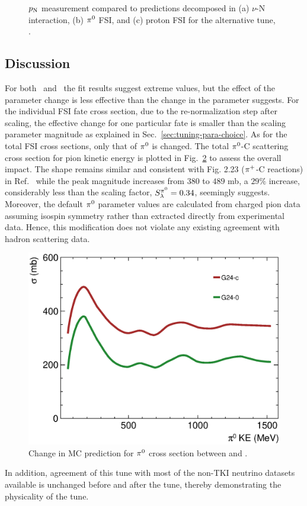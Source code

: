 \begin{figure}[!htb]
    \caption{\label{fig:minpiz-alttune} \minpiz $p_\textrm{N}$ measurement compared to \genie predictions decomposed in  (a) $\nu$-N interaction, (b) $\pi^0$ FSI, and (c) proton FSI for the alternative tune, \gT.} 
\end{figure}


\subsection{Discussion}
For both \gC\ and \gT\ the fit results suggest extreme values, but the effect of the parameter change is less effective than the change in the parameter suggests. 
For the individual FSI fate cross section, due to the re-normalization step after scaling, the effective change for one particular fate is smaller than the scaling parameter magnitude as explained in Sec.~\ref{sec:tuning-para-choice}. 
As for the total FSI cross sections, only that of $\pi^0$ is changed. The total $\pi^0$-C scattering cross section for pion kinetic energy is plotted in Fig.~\ref{fig:pizmfp_change} to assess the overall impact. 
The shape remains similar and consistent with Fig. 2.23 ($\pi^+$-C reactions) in Ref.~\cite{Andreopoulos:2015wxa} while the peak magnitude increases from $380$ to $489$ mb, a $29\%$ increase, considerably less than the scaling factor, $S_\lambda^{\pi^{0}}=0.34$, seemingly suggests. 
Moreover, the default $\pi^0$ parameter values are calculated from charged pion data assuming isospin symmetry rather than extracted directly from experimental data. 
Hence, this modification does not violate any existing agreement with hadron scattering data.
\begin{figure}[!htb] 	
    \centering 		
    \includegraphics[width=\sgfigwid\textwidth]{figures/tuning/pi0mfp_change_covfix.eps}
    \caption{\label{fig:pizmfp_change} Change in MC prediction for $\pi^0$ cross section between \gZero and \gC . } 
\end{figure}
In addition, agreement of this tune with most of the non-TKI neutrino datasets available is unchanged before and after the tune,  thereby demonstrating the physicality of the tune.

